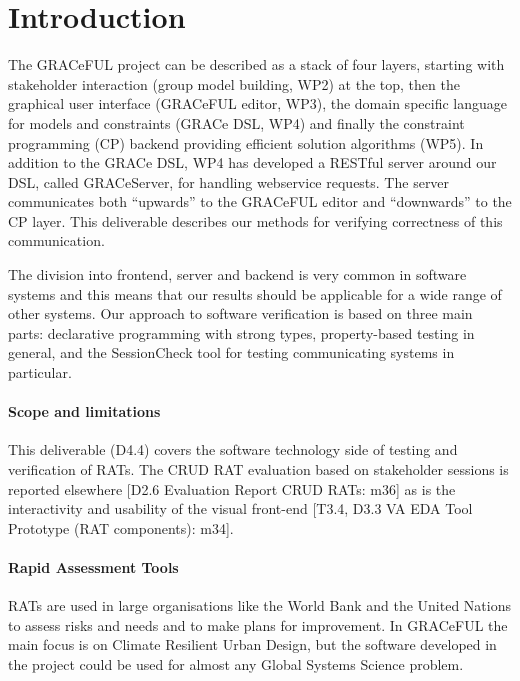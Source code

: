 \documentclass{article}
\begin{document}
\section{Introduction}
\label{sec:intro}

The GRACeFUL project can be described as a stack of four layers,
starting with stakeholder interaction (group model building, WP2) at
the top, then the graphical user interface (GRACeFUL editor, WP3), the
domain specific language for models and constraints (GRACe DSL, WP4)
and finally the constraint programming (CP) backend providing
efficient solution algorithms (WP5).
%
In addition to the GRACe DSL, WP4 has developed a RESTful server around our DSL,
called GRACeServer, for handling webservice requests. The server communicates
both ``upwards'' to the GRACeFUL editor and ``downwards'' to the CP layer.
%
This deliverable describes our methods for verifying correctness of
this communication.

The division into frontend, server and backend is very common in
software systems and this means that our results should be applicable
for a wide range of other systems.
%
Our approach to software verification is based on three main parts:
%
declarative programming with strong types, property-based testing in
general, and the SessionCheck tool for testing communicating systems
in particular.

\paragraph{Scope and limitations}

This deliverable (D4.4) covers the software technology side of testing
and verification of RATs.
%
The CRUD RAT evaluation based on stakeholder sessions is reported
elsewhere [D2.6 Evaluation Report CRUD RATs: m36] as is the
interactivity and usability of the visual front-end [T3.4, D3.3 VA EDA
Tool Prototype (RAT components): m34].

\paragraph{Rapid Assessment Tools}

RATs are used in large organisations like the World Bank and the
United Nations to assess risks and needs and to make plans for
improvement.
In GRACeFUL the main focus is on Climate Resilient Urban Design, but
the software developed in the project could be used for almost any
Global Systems Science problem.
\end{document}
